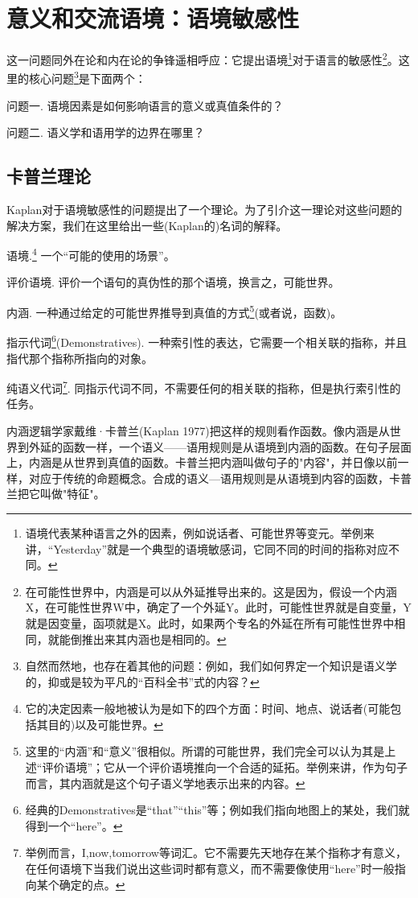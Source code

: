\documentclass{article}
\begin{document}
\section{意义和交流语境：语境敏感性}
这一问题同外在论和内在论的争锋遥相呼应：它提出语境\footnote{语境代表某种语言之外的因素，例如说话者、可能世界等变元。举例来讲，“Yesterday”就是一个典型的语境敏感词，它同不同的时间的指称对应不同。}对于语言的敏感性\footnote{在可能性世界中，内涵是可以从外延推导出来的。这是因为，假设一个内涵X，在可能性世界W中，确定了一个外延Y。此时，可能性世界就是自变量，Y就是因变量，函项就是X。此时，如果两个专名的外延在所有可能性世界中相同，就能倒推出来其内涵也是相同的。}。这里的核心问题\footnote{自然而然地，也存在着其他的问题：例如，我们如何界定一个知识是语义学的，抑或是较为平凡的“百科全书”式的内容？}是下面两个：

{\kaishu 问题一.}
语境因素是如何影响语言的意义或真值条件的？

{\kaishu 问题二.}
语义学和语用学的边界在哪里？
\subsection{卡普兰理论}
Kaplan对于语境敏感性的问题提出了一个理论。为了引介这一理论对这些问题的解决方案，我们在这里给出一些(Kaplan的)名词的解释。

{\heiti 语境.}\footnote{它的决定因素一般地被认为是如下的四个方面：时间、地点、说话者(可能包括其目的)以及可能世界。}
一个“可能的使用的场景”。

{\heiti 评价语境.}
评价一个语句的真伪性的那个语境，换言之，可能世界。

{\heiti 内涵.}
一种通过给定的可能世界推导到真值的方式\footnote{这里的“内涵”和“意义”很相似。所谓的可能世界，我们完全可以认为其是上述“评价语境”；它从一个评价语境推向一个合适的延拓。举例来讲，作为句子而言，其内涵就是这个句子语义学地表示出来的内容。}(或者说，函数)。

{\heiti 指示代词\footnote{经典的Demonstratives是“that”“this”等；例如我们指向地图上的某处，我们就得到一个“here”。}(Demonstratives).}
一种索引性的表达，它需要一个相关联的指称，并且指代那个指称所指向的对象。

{\heiti 纯语义代词\footnote{举例而言，I,now,tomorrow等词汇。它不需要先天地存在某个指称才有意义，在任何语境下当我们说出这些词时都有意义，而不需要像使用“here”时一般指向某个确定的点。}.}
同指示代词不同，不需要任何的相关联的指称，但是执行索引性的任务。

内涵逻辑学家戴维·卡普兰(Kaplan 1977)把这样的规则看作函数。像内涵是从世界到外延的函数一样，一个语义——语用规则是从语境到内涵的函数。在句子层面上，内涵是从世界到真值的函数。卡普兰把内涵叫做句子的"内容"，并日像以前一样，对应于传统的命题概念。合成的语义—语用规则是从语境到内容的函数，卡普兰把它叫做"特征"。
\end{document}
